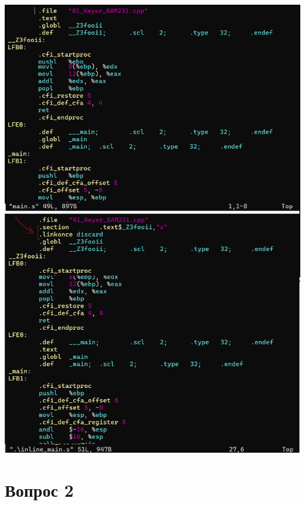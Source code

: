 \documentclass[12pt]{article}
\begin{document}
	\includegraphics[width=\linewidth]{question_1.png}
	
	\section*{Вопрос 2}
	
\end{document}
